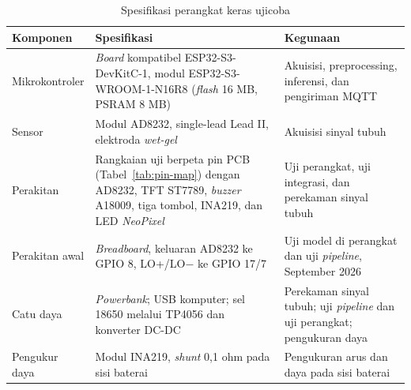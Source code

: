 \begin{table}[!ht]
  \centering
  \caption{Spesifikasi perangkat keras ujicoba}
  \label{tab:perangkat-keras-uji}
  \setlength{\tabcolsep}{4pt}
  \renewcommand{\arraystretch}{1.15}
  \small
  \begin{tabularx}{\linewidth}{>{\RaggedRight\arraybackslash}p{2.4cm}>{\RaggedRight\arraybackslash}X>{\RaggedRight\arraybackslash}X}
    \toprule
    \textbf{Komponen} & \textbf{Spesifikasi} & \textbf{Kegunaan} \\
    \midrule
    Mikrokontroler & \textit{Board} kompatibel ESP32-S3-DevKitC-1, modul ESP32-S3-WROOM-1-N16R8 (\textit{flash} 16 MB, PSRAM 8 MB) & Akuisisi, preprocessing, inferensi, dan pengiriman MQTT \\
    Sensor & Modul AD8232, single-lead Lead II, elektroda \textit{wet-gel} & Akuisisi sinyal tubuh \\
    Perakitan & Rangkaian uji berpeta pin PCB (Tabel~\ref{tab:pin-map}) dengan AD8232, TFT ST7789, \textit{buzzer} A18009, tiga tombol, INA219, dan LED \textit{NeoPixel} & Uji perangkat, uji integrasi, dan perekaman sinyal tubuh \\
    Perakitan awal & \textit{Breadboard}, keluaran AD8232 ke GPIO 8, LO+/LO$-$ ke GPIO 17/7 & Uji model di perangkat dan uji \textit{pipeline}, September 2026 \\
    Catu daya & \textit{Powerbank}; USB komputer; sel 18650 melalui TP4056 dan konverter DC-DC & Perekaman sinyal tubuh; uji \textit{pipeline} dan uji perangkat; pengukuran daya \\
    Pengukur daya & Modul INA219, \textit{shunt} 0,1 ohm pada sisi baterai & Pengukuran arus dan daya pada sisi baterai \\

\end{tabularx}
\end{table}
